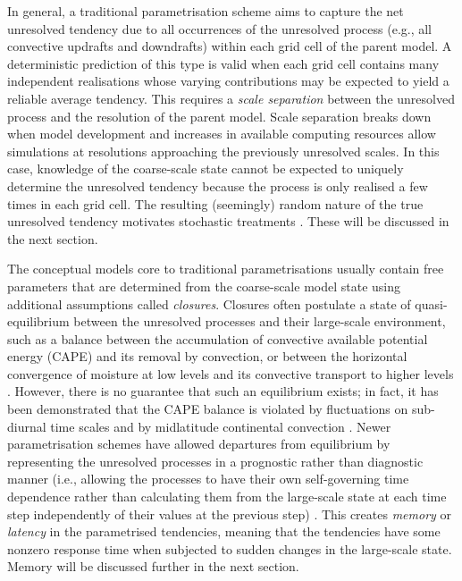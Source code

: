 \documentclass[titlepage,twoside]{article}
\numberwithin{equation}{section}
\begin{document}
In general, a traditional parametrisation scheme aims to capture the net
unresolved tendency due to all occurrences of the unresolved process (e.g., all
convective updrafts and downdrafts) within each grid cell of the parent model.
A deterministic prediction of this type is valid when each grid cell contains
many independent realisations whose varying contributions may be expected to
yield a reliable average tendency. This requires a \emph{scale separation}
between the unresolved process and the resolution of the parent model. Scale
separation breaks down when model development and increases in available
computing resources allow simulations at resolutions approaching the previously
unresolved scales. In this case, knowledge of the coarse-scale state cannot be
expected to uniquely determine the unresolved tendency because the process is
only realised a few times in each grid cell. The resulting (seemingly) random
nature of the true unresolved tendency motivates stochastic treatments
\parencite{mcfarlane2011,christensen2022,berner2017}. These will be discussed
in the next section.

The conceptual models core to traditional parametrisations usually contain free
parameters that are determined from the coarse-scale model state using
additional assumptions called \emph{closures}. Closures often postulate a state
of quasi-equilibrium between the unresolved processes and their large-scale
environment, such as a balance between the accumulation of convective available
potential energy (CAPE) and its removal by convection, or between the
horizontal convergence of moisture at low levels and its convective transport
to higher levels \parencite{mcfarlane2011,christensen2022,palmer2019}. However,
there is no guarantee that such an equilibrium exists; in fact, it has been
demonstrated that the CAPE balance is violated by fluctuations on sub-diurnal
time scales \parencite{donner2003} and by midlatitude continental convection
\parencite{zhang2002}. Newer parametrisation schemes have allowed departures
from equilibrium by representing the unresolved processes in a prognostic
rather than diagnostic manner (i.e., allowing the processes to have their own
self-governing time dependence rather than calculating them from the
large-scale state at each time step independently of their values at the
previous step) \parencite{rio2019,berner2017}. This creates \emph{memory} or
\emph{latency} in the parametrised tendencies, meaning that the tendencies have
some nonzero response time when subjected to sudden changes in the large-scale
state. Memory will be discussed further in the next section.
\end{document}
